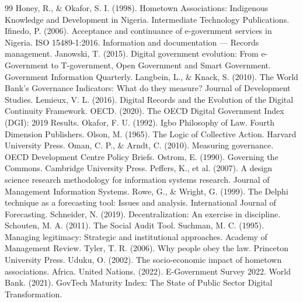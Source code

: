 \documentclass[sigconf,anonymous]{acmart}
\begin{document}
\begin{thebibliography}{99}
 Honey, R., \& Okafor, S. I. (1998). Hometown Associations: Indigenous Knowledge and Development in Nigeria. Intermediate Technology Publications.
 Ifinedo, P. (2006). Acceptance and continuance of e-government services in Nigeria.
 ISO 15489-1:2016. Information and documentation — Records management.
 Janowski, T. (2015). Digital government evolution: From e-Government to T-government, Open Government and Smart Government. Government Information Quarterly.
 Langbein, L., \& Knack, S. (2010). The World Bank’s Governance Indicators: What do they measure? Journal of Development Studies.
 Lemieux, V. L. (2016). Digital Records and the Evolution of the Digital Continuity Framework.
 OECD. (2020). The OECD Digital Government Index (DGI): 2019 Results.
 Okafor, F. U. (1992). Igbo Philosophy of Law. Fourth Dimension Publishers.
 Olson, M. (1965). The Logic of Collective Action. Harvard University Press.
 Oman, C. P., \& Arndt, C. (2010). Measuring governance. OECD Development Centre Policy Briefs.
 Ostrom, E. (1990). Governing the Commons. Cambridge University Press.
 Peffers, K., et al. (2007). A design science research methodology for information systems research. Journal of Management Information Systems.
 Rowe, G., \& Wright, G. (1999). The Delphi technique as a forecasting tool: Issues and analysis. International Journal of Forecasting.
 Schneider, N. (2019). Decentralization: An exercise in discipline.
 Schouten, M. A. (2011). The Social Audit Tool.
 Suchman, M. C. (1995). Managing legitimacy: Strategic and institutional approaches. Academy of Management Review.
 Tyler, T. R. (2006). Why people obey the law. Princeton University Press.
 Uduku, O. (2002). The socio-economic impact of hometown associations. Africa.
 United Nations. (2022). E-Government Survey 2022.
 World Bank. (2021). GovTech Maturity Index: The State of Public Sector Digital Transformation.

\end{thebibliography}
\end{document}
